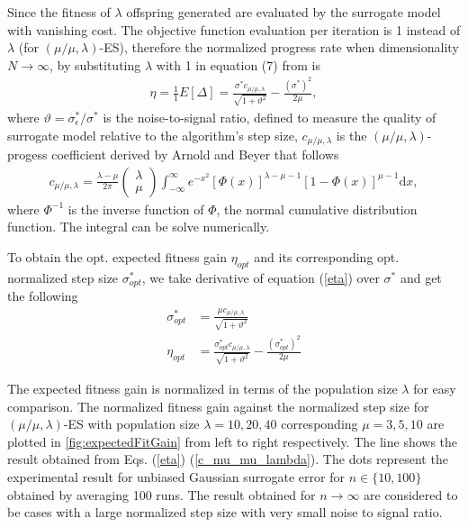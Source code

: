 Since the fitness of $\lambda$ offspring generated are evaluated by the surrogate model with vanishing cost. The objective function evaluation per iteration is 1 instead of $\lambda$ (for $(\mu/\mu,\lambda)$-ES), therefore the normalized progress rate when dimensionality $N \rightarrow \infty$, by substituting $\lambda$ with 1 in equation (7) from \cite{ARNOLD2001127} is 
\begin{align}\label{eta}
\eta = \frac{1}{1}E[ \Delta] = \frac{\sigma^* c_{\mu / \mu, \lambda}}{\sqrt {1+ \vartheta^2}} - \frac{(\sigma^*)^2}{2 \mu},
\end{align}
where $\vartheta = \sigma_\epsilon^*/\sigma^*$ is the noise-to-signal ratio, defined to measure the quality of surrogate model relative to the algorithm's step size, $c_{\mu/\mu,\lambda}$ is the $(\mu/\mu,\lambda)$-progess coefficient derived by Arnold and Beyer \cite{Arnold:2000:EMS:645825.669117} that follows
\begin{align}\label{c_mu_mu_lambda}
c_{\mu/\mu,\lambda}  = \frac{\lambda-\mu}{2 \pi} \begin{pmatrix} \lambda \\ \mu \end{pmatrix} \int_{-\infty}^{\infty} e^{-x^2}   \left [ \Phi(x)\right]^{\lambda-\mu-1}  \left[ 1- \Phi (x) \right]^{\mu-1}  \text{d} x,
\end{align}
where $\Phi^{-1}$ is the inverse function of $\Phi$, the normal cumulative distribution function. The integral can be solve numerically.  

To obtain the opt. expected fitness gain $\eta_{opt}$ and its corresponding opt. normalized step size $\sigma^*_{opt}$, we take derivative of equation (\ref{eta}) over $\sigma^*$ and get the following 
\begin{align}\label{opt}
\sigma^*_{opt} &= \frac{ \mu c_{\mu / \mu, \lambda}}{\sqrt {1+ \vartheta^2}}\\
\eta_{opt} &= \frac{\sigma^*_{opt} c_{\mu / \mu, \lambda}}{\sqrt {1+ \vartheta^2}} - \frac{(\sigma^*_{opt})^2}{2 \mu} 
\end{align}

The expected fitness gain is normalized in terms of the population size $\lambda$ for easy comparison. The normalized fitness gain against the normalized step size for $(\mu/\mu,\lambda)$-ES with population size $\lambda=10,20,40$ corresponding $\mu=3,5,10$ are plotted in \ref{fig:expectedFitGain} from left to right respectively. The line shows the result obtained from Eqs. (\ref{eta}) (\ref{c_mu_mu_lambda}). The dots represent the experimental result for unbiased Gaussian surrogate error for $n \in \{10,100 \}$ obtained by averaging 100 runs. The result obtained for $n \rightarrow \infty$ are considered to be cases with a large normalized step size with very small noise to signal ratio. 

